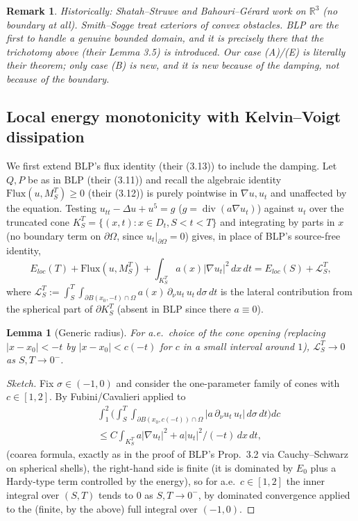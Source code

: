 \documentclass[11pt,letterpaper]{amsart}
\newtheorem{lemma}[theorem]{Lemma}
\newtheorem{remark}[theorem]{Remark}
\newcommand{\dive}{\operatorname{div}}
\newcommand{\Om}{\Omega}
\begin{document}
\begin{remark}
Historically: Shatah--Struwe \cite{ShatahStruwe} and Bahouri--Gérard \cite{BahouriGerard} work on $\mathbb R^3$ (no boundary at all). Smith--Sogge \cite{SmithSogge1995} treat exteriors of convex obstacles. BLP \cite{BurqLebeauPlanchon} are the first to handle a genuine bounded domain, and it is precisely there that the trichotomy above (their Lemma 3.5) is introduced. Our case (A)/(E) is literally their theorem; only case (B) is new, and it is new because of the damping, not because of the boundary.
\end{remark}

\subsection{Local energy monotonicity with Kelvin--Voigt dissipation}

We first extend BLP's flux identity (their (3.13)) to include the damping. Let $Q,P$ be as in BLP (their (3.11)) and recall the algebraic identity $\mathrm{Flux}(u,M_S^T)\ge0$ (their (3.12)) is purely pointwise in $\nabla u,u_t$ and unaffected by the equation. Testing $u_{tt}-\Delta u+u^5=g$ ($g=\dive(a\nabla u_t)$) against $u_t$ over the truncated cone $K_S^T=\{(x,t): x\in D_t, S<t<T\}$ and integrating by parts in $x$ (no boundary term on $\partial\Om$, since $u_t|_{\partial\Om}=0$) gives, in place of BLP's source-free identity,
\begin{equation}\label{eq:flux-KV}
E_{loc}(T) + \mathrm{Flux}(u,M_S^T) + \int_{K_S^T} a(x)|\nabla u_t|^2\,dx\,dt = E_{loc}(S) + \mathcal L_S^T,
\end{equation}
where $\mathcal L_S^T := \int_S^T\int_{\partial B(x_0,-t)\cap\Om} a(x)\,\partial_\nu u_t\, u_t\,d\sigma\,dt$ is the lateral contribution from the spherical part of $\partial K_S^T$ (absent in BLP since there $a\equiv0$).

\begin{lemma}[Generic radius]\label{lem:generic}
For a.e.\ choice of the cone opening (replacing $|x-x_0|<-t$ by $|x-x_0|<c(-t)$ for $c$ in a small interval around $1$), $\mathcal L_S^T\to0$ as $S,T\to0^-$.
\end{lemma}
\begin{proof}[Sketch]
Fix $\sigma\in(-1,0)$ and consider the one-parameter family of cones with $c\in[1,2]$. By Fubini/Cavalieri applied to
\begin{eqnarray}
&&\int_1^2\Big(\int_{S}^{T}\!\int_{\partial B(x_0,c(-t))\cap\Om}|a\,\partial_\nu u_t\,u_t|\,d\sigma\,dt\Big)dc\\
&&\le C\int_{K_S^T} a|\nabla u_t|^2 + a|u_t|^2/(-t)\,dx\,dt,\nonumber
\end{eqnarray}
(coarea formula, exactly as in the proof of BLP's Prop.\ 3.2 via Cauchy--Schwarz on spherical shells), the right-hand side is finite (it is dominated by $E_0$ plus a Hardy-type term controlled by the energy), so for a.e.\ $c\in[1,2]$ the inner integral over $(S,T)$ tends to $0$ as $S,T\to0^-$, by dominated convergence applied to the (finite, by the above) full integral over $(-1,0)$.
\end{proof}
\end{document}
